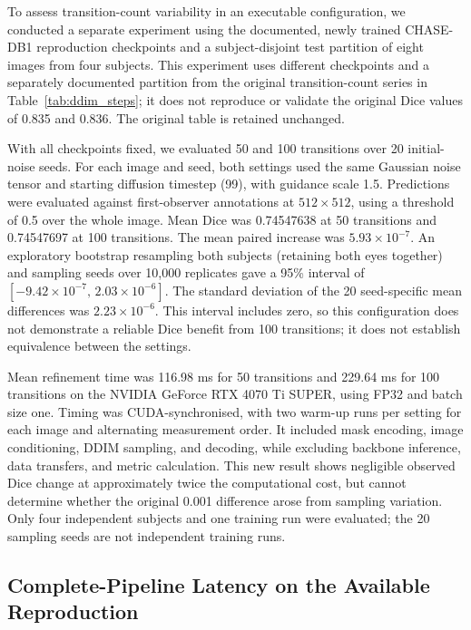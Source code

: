 \documentclass[jimaging,article,submit,pdftex,moreauthors]{Definitions/mdpi}%
\begin{document}
To assess transition-count variability in an executable configuration, we conducted a separate experiment using the documented, newly trained CHASE-DB1 reproduction checkpoints and a subject-disjoint test partition of eight images from four subjects. This experiment uses different checkpoints and a separately documented partition from the original transition-count series in Table~\ref{tab:ddim_steps}; it does not reproduce or validate the original Dice values of 0.835 and 0.836. The original table is retained unchanged.



With all checkpoints fixed, we evaluated 50 and 100 transitions over 20 initial-noise seeds. For each image and seed, both settings used the same Gaussian noise tensor and starting diffusion timestep (99), with guidance scale 1.5. Predictions were evaluated against first-observer annotations at $512\times512$, using a threshold of 0.5 over the whole image. Mean Dice was 0.74547638 at 50 transitions and 0.74547697 at 100 transitions. The mean paired increase was $5.93\times10^{-7}$. An exploratory bootstrap resampling both subjects (retaining both eyes together) and sampling seeds over 10,000 replicates gave a 95\% interval of $[-9.42\times10^{-7},\,2.03\times10^{-6}]$. The standard deviation of the 20 seed-specific mean differences was $2.23\times10^{-6}$. This interval includes zero, so this configuration does not demonstrate a reliable Dice benefit from 100 transitions; it does not establish equivalence between the settings.



Mean refinement time was 116.98 ms for 50 transitions and 229.64 ms for 100 transitions on the NVIDIA GeForce RTX 4070 Ti SUPER, using FP32 and batch size one. Timing was CUDA-synchronised, with two warm-up runs per setting for each image and alternating measurement order. It included mask encoding, image conditioning, DDIM sampling, and decoding, while excluding backbone inference, data transfers, and metric calculation. This new result shows negligible observed Dice change at approximately twice the computational cost, but cannot determine whether the original 0.001 difference arose from sampling variation. Only four independent subjects and one training run were evaluated; the 20 sampling seeds are not independent training runs.





\subsection{Complete-Pipeline Latency on the Available Reproduction}
\end{document}
